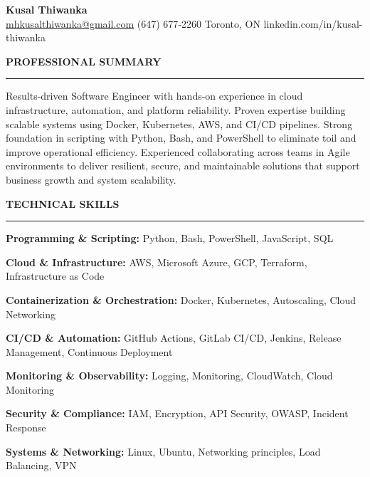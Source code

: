 \documentclass[10pt,letterpaper]{article}
\begin{document}
\begin{center}
{\LARGE\textbf{Kusal Thiwanka}}\\[3pt]
\href{mailto:mhkusalthiwanka@gmail.com}{mhkusalthiwanka@gmail.com}\hspace{2em}%
(647) 677{-}2260\hspace{2em}%
Toronto, ON\hspace{2em}
linkedin.com/in/kusal-thiwanka
\end{center}

\vspace{6pt}

\textbf{PROFESSIONAL SUMMARY}\\[-8pt]
\noindent\rule{\textwidth}{1pt}

\vspace{-2pt}

Results-driven Software Engineer with hands-on experience in cloud infrastructure, automation, and platform reliability. Proven expertise building scalable systems using Docker, Kubernetes, AWS, and CI/CD pipelines. Strong foundation in scripting with Python, Bash, and PowerShell to eliminate toil and improve operational efficiency. Experienced collaborating across teams in Agile environments to deliver resilient, secure, and maintainable solutions that support business growth and system scalability.

\vspace{8pt}

\textbf{TECHNICAL SKILLS}\\[-8pt]
\noindent\rule{\textwidth}{1pt}

\vspace{-2pt}

\textbf{Programming \& Scripting:} Python, Bash, PowerShell, JavaScript, SQL

\textbf{Cloud \& Infrastructure:} AWS, Microsoft Azure, GCP, Terraform, Infrastructure as Code

\textbf{Containerization \& Orchestration:} Docker, Kubernetes, Autoscaling, Cloud Networking

\textbf{CI/CD \& Automation:} GitHub Actions, GitLab CI/CD, Jenkins, Release Management, Continuous Deployment

\textbf{Monitoring \& Observability:} Logging, Monitoring, CloudWatch, Cloud Monitoring

\textbf{Security \& Compliance:} IAM, Encryption, API Security, OWASP, Incident Response

\textbf{Systems \& Networking:} Linux, Ubuntu, Networking principles, Load Balancing, VPN
\end{document}
